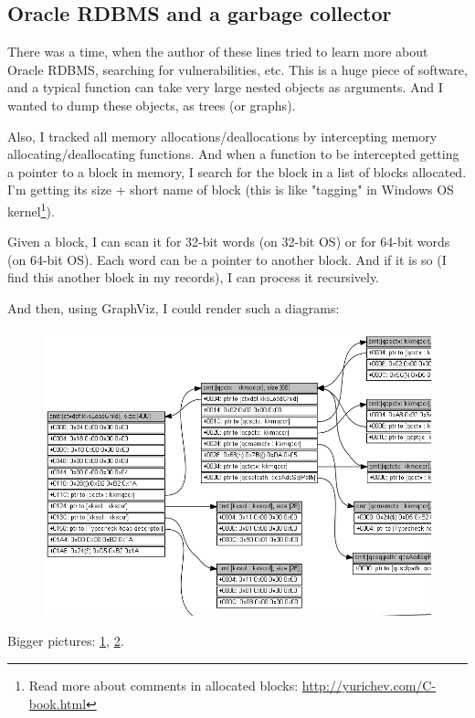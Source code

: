 \subsection{Oracle RDBMS and a garbage collector}

There was a time, when the author of these lines tried to learn more about Oracle RDBMS, searching for vulnerabilities, etc.
This is a huge piece of software, and a typical function can take very large nested objects as arguments.
And I wanted to dump these objects, as trees (or graphs).

Also, I tracked all memory allocations/deallocations by intercepting memory allocating/deallocating functions.
And when a function to be intercepted getting a pointer to a block in memory, I search for the block in a list of blocks allocated.
I'm getting its size + short name of block
(this is like "tagging" in Windows OS kernel\footnote{Read more about comments in allocated blocks: \CNotes{} \url{http://yurichev.com/C-book.html}}).

Given a block, I can scan it for 32-bit words (on 32-bit OS) or for 64-bit words (on 64-bit OS).
Each word can be a pointer to another block.
And if it is so (I find this another block in my records), I can process it recursively.

And then, using GraphViz, I could render such a diagrams:

\begin{figure}[H]
\centering
\includegraphics[scale=0.55]{advanced/450_more_ptrs/oracle2_crop.png}
\end{figure}

Bigger pictures:
\href{https://raw.githubusercontent.com/DennisYurichev/RE-for-beginners/master/advanced/450_more_ptrs/oracle1.png}{1},
\href{https://raw.githubusercontent.com/DennisYurichev/RE-for-beginners/master/advanced/450_more_ptrs/oracle2.png}{2}.

